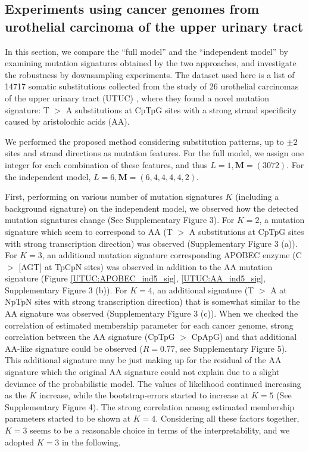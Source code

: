 \subsection*{Experiments using cancer genomes from urothelial carcinoma of the upper urinary tract}

In this section, we compare the ``full model'' and the ``independent model'' by examining mutation signatures obtained by the two approaches,
and investigate the robustness by downsampling experiments.
The dataset used here is a list of 14717 somatic substitutions 
collected from the study of 26 urothelial carcinomas of the upper urinary tract (UTUC) \cite{pmid23926200},
where they found a novel mutation signature: 
T $>$ A substitutions at CpTpG sites with a strong strand specificity caused by aristolochic acids (AA).

We performed the proposed method considering substitution patterns, up to $\pm 2$ sites and strand directions as mutation features.
For the full model, we assign one integer for each combination of these features, and thus $L = 1, \bm{M} = (3072)$.
For the independent model, $L = 6, \bm{M} = (6, 4, 4, 4, 4, 2)$.

First, performing on various number of mutation signatures $K$ (including a background signature) on the independent model, 
we observed how the detected mutation signatures change (See Supplementary Figure 3).
For $K = 2$, a mutation signature which seem to correspond to AA  (T $>$ A substitutions at CpTpG sites with strong transcription direction) was observed (Supplementary Figure 3 (a)).
For $K = 3$, an additional mutation signature corresponding APOBEC enzyme (C $>$ [AGT] at TpCpN sites) was observed
in addition to the AA mutation signature (Figure \ref{UTUC:APOBEC_ind5_sig}, \ref{UTUC:AA_ind5_sig}, Supplementary Figure 3 (b)).
For $K = 4$, an additional signature (T $>$ A at NpTpN sites with strong transcription direction) 
that is somewhat similar to the AA signature was observed (Supplementary Figure 3 (c)). 
When we checked the correlation of estimated membership parameter for each cancer genome, 
strong correlation between the AA signature (CpTpG $>$ CpApG) and that additional AA-like signature could be observed ($R = 0.77$, see Supplementary Figure 5). 
This additional signature may be just making up for the residual of the AA signature 
which the original AA signature could not explain due to a slight deviance of the probabilistic model.
The values of likelihood continued increasing as the $K$ increase, while the bootstrap-errors started to increase at $K = 5$ (See Supplementary Figure 4).
The strong correlation among estimated membership parameters started to be shown at $K = 4$.
Considering all these factors together, $K = 3$ seems to be a reasonable choice in terms of the interpretability,
and we adopted $K = 3$ in the following.


